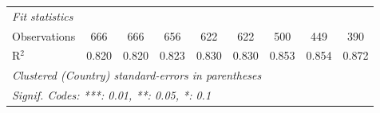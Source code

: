 \begin{tabular}{lcccccccc}
   \midrule \emph{Fit statistics}\\
   Observations                                                     & 666     & 666     & 656     & 622           & 622           & 500          & 449          & 390\\  
   R$^2$                                                            & 0.820   & 0.820   & 0.823   & 0.830         & 0.830         & 0.853        & 0.854        & 0.872\\  
   \midrule
   \multicolumn{9}{l}{\emph{Clustered (Country) standard-errors in parentheses}}\\
   \multicolumn{9}{l}{\emph{Signif. Codes: ***: 0.01, **: 0.05, *: 0.1}}\\
\end{tabular}
\par\endgroup


